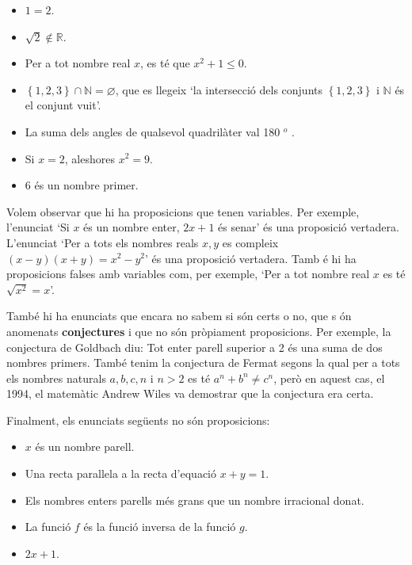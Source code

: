 \begin{itemize}
\item $1=2$.

\item $\sqrt{2}\notin\mathbb{R}$.

\item Per a tot nombre real $x$, es t\'{e} que $x^{2}+1\leq0$.

\item $\left\{ 1,2,3\right\} \cap\mathbb{N}=\varnothing$, que es llegeix `la
intersecci\'{o} dels conjunts $\left\{ 1,2,3\right\} $ i $\mathbb{N}$ \'{e}s
el conjunt vuit'.

\item La suma dels angles de qualsevol quadril\`{a}ter val 180%
${{}^o}$%
.

\item Si $x=2$, aleshores $x^{2}=9$.

\item 6 \'{e}s un nombre primer.
\end{itemize}

Volem observar que hi ha proposicions que tenen variables. Per exemple,
l'enunciat `Si $x$ \'{e}s un nombre enter, $2x+1$ \'{e}s senar' \'{e}s una
proposici\'{o} vertadera. L'enunciat `Per a tots els nombres reals $x,y$ es
compleix $(x-y)(x+y)=x^{2}-y^{2}$' \'{e}s una proposici\'{o} vertadera. Tamb%
\'{e} hi ha proposicions falses amb variables com, per exemple, `Per a tot
nombre real $x$ es t\'{e} $\sqrt{x^{2}}=x$'.

Tamb\'{e} hi ha enunciats que encara no sabem si s\'{o}n certs o no, que s%
\'{o}n anomenats \textbf{conjectures} i que no s\'{o}n pr\`{o}piament
proposicions. Per exemple, la conjectura de Goldbach diu: Tot enter parell
superior a 2 \'{e}s una suma de dos nombres primers. Tamb\'{e} tenim la
conjectura de Fermat segons la qual per a tots els nombres naturals $a,b,c,n$
i $n>2$ es t\'{e} $a^{n}+b^{n}\neq c^{n}$, per\`{o} en aquest cas, el 1994,
el matem\`{a}tic Andrew Wiles va demostrar que la conjectura era certa.

Finalment, els enunciats seg\"{u}ents no s\'{o}n proposicions:

\begin{itemize}
\item $x$ \'{e}s un nombre parell.

\item Una recta paral\textperiodcentered lela a la recta d'equaci\'{o} $%
x+y=1 $.

\item Els nombres enters parells m\'{e}s grans que un nombre irracional donat.

\item La funci\'{o} $f$ \'{e}s la funci\'{o} inversa de la funci\'{o} $g$.

\item $2x+1$.
\end{itemize}

